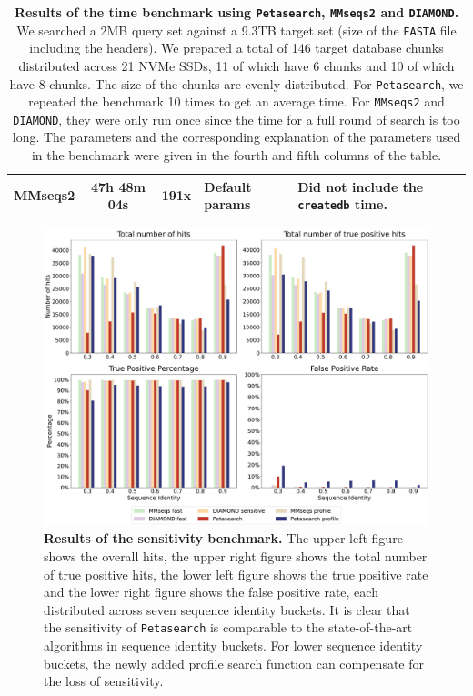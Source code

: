 \begin{figpage}
\begin{table}[]
\begin{tabular}{|c|c|c|l|l|}
      \rowcolor[HTML]{FFFFFF}
      MMseqs2                                                                                & 47h 48m 04s & 191x & Default params                   & Did not include the \texttt{createdb} time. \\ \hline
    \end{tabular}
    \caption{\textbf{Results of the time benchmark using \texttt{Petasearch}, \texttt{MMseqs2} and \texttt{DIAMOND}.}
      We searched a 2MB query set against a 9.3TB target set (size of the \texttt{FASTA} file including the headers). We prepared a total of 146 target database chunks distributed across 21 NVMe SSDs, 11 of which have 6 chunks and 10 of which have 8 chunks.
      The size of the chunks are evenly distributed. For \texttt{Petasearch}, we repeated the benchmark 10 times to get an average time.
      For \texttt{MMseqs2} and \texttt{DIAMOND}, they were only run once since the time for a full round of search is too long. The parameters and the corresponding explanation of the parameters used in the benchmark were given in the fourth and fifth columns of the table.}
    \label{tab:time_benchmark}
  \end{table}
  \restoregeometry
\end{figpage}
\pagebreak
\begin{figpage}
  \captionsetup[figure]{width=.8\linewidth}
  \begin{figure}
    \centering
    \includegraphics[width=\textwidth]{images/everything.pdf}
    \caption{\textbf{Results of the sensitivity benchmark.} The upper left figure shows the overall hits, the upper right figure shows the total number of true positive hits, the lower left figure shows the true positive rate and the lower right figure shows the false positive rate, each distributed across seven sequence identity buckets. It is clear that the sensitivity of \texttt{Petasearch} is comparable to the state-of-the-art algorithms in sequence identity buckets. For lower sequence identity buckets, the newly added profile search function can compensate for the loss of sensitivity.}
    \label{fig:sensitivity}
  \end{figure}
  \restoregeometry
\end{figpage}
\pagebreak
